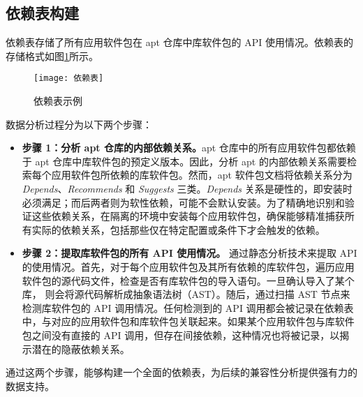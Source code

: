 \subsection{依赖表构建}\label{4.1.2}
依赖表存储了所有应用软件包在 apt 仓库中库软件包的 API 使用情况。依赖表的存储格式如图\ref{fig:dependency}所示。
\begin{figure}[htbp] %
	\centering
	\texttt{[image: 依赖表]}
	\caption{依赖表示例}
	\label{fig:dependency}
\end{figure}
数据分析过程分为以下两个步骤：
\begin{itemize}
	\item \textbf{步骤 1：分析 apt 仓库的内部依赖关系。}apt 仓库中的所有应用软件包都依赖于 apt 仓库中库软件包的预定义版本。因此，分析 apt 的内部依赖关系需要检索每个应用软件包所依赖的库软件包。然而，apt 软件包文档将依赖关系分为 \textit{Depends}、\textit{Recommends} 和 \textit{Suggests} 三类。\textit{Depends} 关系是硬性的，即安装时必须满足；而后两者则为软性依赖，可能不会默认安装。为了精确地识别和验证这些依赖关系，\tool{}在隔离的环境中安装每个应用软件包，确保能够精准捕获所有实际的依赖关系，包括那些仅在特定配置或条件下才会触发的依赖。
	\item \textbf{步骤 2：提取库软件包的所有 API 使用情况。}\tool{} 通过静态分析技术来提取 API 的使用情况。首先，对于每个应用软件包及其所有依赖的库软件包，\tool{}遍历应用软件包的源代码文件，检查是否有库软件包的导入语句。一旦确认导入了某个库，\tool{} 则会将源代码解析成抽象语法树（AST）。随后，通过扫描 AST 节点来检测库软件包的 API 调用情况。任何检测到的 API 调用都会被记录在依赖表中，与对应的应用软件包和库软件包关联起来。如果某个应用软件包与库软件包之间没有直接的 API 调用，但存在间接依赖，这种情况也将被记录，以揭示潜在的隐蔽依赖关系。
\end{itemize}
通过这两个步骤，\tool{}能够构建一个全面的依赖表，为后续的兼容性分析提供强有力的数据支持。

